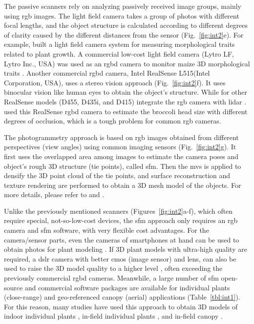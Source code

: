 The passive scanners rely on analyzing passively received image groups, mainly using \gls{rgb} images. The light field camera takes a group of photos with different focal lengths, and the object structure is calculated according to different degrees of clarity caused by the different distances from the sensor (Fig.~\ref{fig:int2}e). For example, \citet{apelt_phytotyping_2015} built a light field camera system for measuring morphological traits related to plant growth. A commercial low-cost light field camera (Lytro LF, Lytro Inc., USA) was used as an \gls{rgbd} camera to monitor maize 3D morphological traits \citep{schima_imagine_2016}. Another commercial \gls{rgbd} camera, Intel RealSense L515(Intel Corporation, USA), uses a stereo vision approach (Fig.~\ref{fig:int2}f). It uses binocular vision like human eyes to obtain the object's structure. While for other RealSense models (D455, D435i, and D415) integrate the \gls{rgb} camera with \gls{lidar} \citep[Table 5]{bartol_review_2021}. \citet{blok_image_2021} used this RealSense \gls{rgbd} camera to estimate the broccoli head size with different degrees of occlusion, which is a tough problem for common \gls{rgb} cameras. 

The photogrammetry approach is based on \gls{rgb} images obtained from different perspectives (view angles) using common imaging sensors (Fig.~\ref{fig:int2}g). It first uses the overlapped area among images to estimate the camera poses and object's rough 3D structure (tie points), called \acrfull{sfm}. Then the \gls{mvs} is applied to densify the 3D point cloud of the tie points, and surface reconstruction and texture rendering are performed to obtain a 3D mesh model of the objects. For more details, please refer to \citet{hartley_multiple_2000} and \citet{snavely_scene_2010}.

Unlike the previously mentioned scanners (Figures~\ref{fig:int2}a-f), which often require special, not-so-low-cost devices, the \gls{sfm} approach only requires an \gls{rgb} camera and \gls{sfm} software, with very flexible cost advantages. For the camera/sensor parts, even the cameras of smartphones at hand can be used to obtain photos for plant modeling \citep{li_measuring_2020}. If 3D plant models with ultra-high quality are required, a \gls{dslr} camera with better \gls{cmos} (image sensor) and lens, can also be used to raise the 3D model quality to a higher level \citep{nguyen_3d_2016, drofova_use_2023}, often exceeding the previously commercial \gls{rgbd} cameras. Meanwhile, a large number of \gls{sfm} open-source and commercial software packages are available for individual plants (close-range) and geo-referenced canopy (aerial) applications (Table~\ref{tbl:int1}). For this reason, many studies have used this approach to obtain 3D models of indoor individual plants \citep{wu_mvs-pheno_2020, zhou_automated_2019}, in-field individual plants \citep{jay_field_2015, herrero_structural_2023}, and in-field canopy \citep{kim_modeling_2018, herrero_canopy_2020}.


